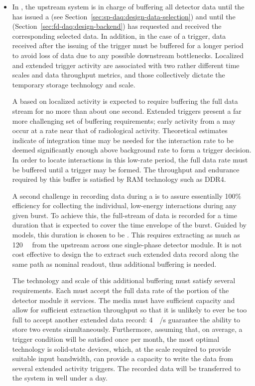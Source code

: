 \begin{itemize}
\item In , the upstream  system is in charge of buffering all
detector data until the  has issued a 
(see Section~\ref{sec:sp-daq:design-data-selection}) and until the
 (Section~\ref{sec:fd-daq:design-backend}) has requested
and received the corresponding selected data. 
In addition, in the case of a  trigger, data received after
the issuing of the trigger must be buffered for a longer period to
avoid loss of data due to any possible downstream
bottlenecks. Localized and extended trigger activity are associated
with two rather different time scales and data throughput metrics, and
those collectively dictate the temporary storage technology and scale. 

A  based on localized
activity is expected to require buffering the full data stream for no more than about one second.
Extended triggers present a far more challenging set of buffering
requirements; 
early activity from a  may occur at a rate near that of radiological activity.
Theoretical estimates indicate \snbpretime of integration time may be needed for the
 interaction rate to be deemed significantly enough above
background rate to form a trigger decision.
In order to locate interactions in this low-rate period, the full data rate must be buffered until a  trigger may be formed.
The throughput and endurance required by this buffer is satisfied by RAM technology such as DDR4.

A second challenge in recording data during a  is to assure
essentially 100\% efficiency for collecting the individual, low-energy
interactions during any given  burst. 
To achieve this, the full-stream of data is recorded for a time duration that is expected to cover the time envelope of the burst.
Guided by  models, this duration is chosen to be \snbtime.
This requires extracting as much as \SI{120}{\tera\byte} from the  upstream  across one single-phase detector module.
It is not cost effective to design the  to extract such
extended data record along the same path as nominal readout, thus
additional buffering is needed.

The technology and scale of this additional buffering must satisfy several requirements. 
Each  must accept the full data rate of the portion of the detector module it services.
The media must have sufficient capacity and allow for sufficient extraction throughput so that it is unlikely to ever be too full to accept another extended data record: \SI{4}{\tera\bit/\second} guarantee the ability to store two  events simultaneously.
Furthermore, assuming that, on average, a  trigger condition will be
satisfied once per month, the most optimal technology is
solid-state  devices, which, at the scale required to provide suitable input bandwidth, can provide a capacity to write the data from several extended activity triggers. The recorded data will be transferred to the  system in well under a day.


\end{itemize}
